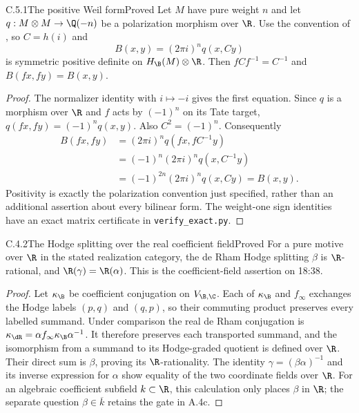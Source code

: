 \begin{result}{C.5.1}{The positive Weil form}{Proved}
Let $M$ have pure weight $n$ and let $q:M\otimes M\to\Q(-n)$ be a polarization morphism over $\R$. Use the convention of \cite[(5.4)--(5.5)]{MilneShimura}, so $C=h(i)$ and
\[
 B(x,y)=(2\pi i)^n q(x,Cy)
\]
is symmetric positive definite on $H_\B(M)\otimes\R$. Then $fCf^{-1}=C^{-1}$ and $B(fx,fy)=B(x,y)$.
\end{result}
\begin{proof}
The normalizer identity with $i\mapsto-i$ gives the first equation. Since $q$ is a morphism over $\R$ and $f$ acts by $(-1)^n$ on its Tate target, $q(fx,fy)=(-1)^nq(x,y)$. Also $C^2=(-1)^n$. Consequently
\[
 \begin{aligned}
 B(fx,fy)
 &=(2\pi i)^nq(fx,fC^{-1}y)\\
 &=(-1)^n(2\pi i)^nq(x,C^{-1}y)\\
 &=(-1)^{2n}(2\pi i)^nq(x,Cy)=B(x,y).
 \end{aligned}
\]
Positivity is exactly the polarization convention just specified, rather than an additional assertion about every bilinear form. The weight-one sign identities have an exact matrix certificate in \texttt{verify\_exact.py}.
\end{proof}

\begin{result}{C.4.2}{The Hodge splitting over the real coefficient field}{Proved}
For a pure motive over $\R$ in the stated realization category, the de Rham Hodge splitting $\beta$ is $\R$-rational, and $\R(\gamma)=\R(\alpha)$. This is the coefficient-field assertion on 18:38.
\end{result}
\begin{proof}
Let $\kappa_{\B}$ be coefficient conjugation on $V_{\B,\C}$. Each of $\kappa_{\B}$ and $f_\infty$ exchanges the Hodge labels $(p,q)$ and $(q,p)$, so their commuting product preserves every labelled summand. Under comparison the real de Rham conjugation is $\kappa_{\dR}=\alpha f_\infty\kappa_{\B}\alpha^{-1}$. It therefore preserves each transported summand, and the isomorphism from a summand to its Hodge-graded quotient is defined over $\R$. Their direct sum is $\beta$, proving its $\R$-rationality. The identity $\gamma=(\beta\alpha)^{-1}$ and its inverse expression for $\alpha$ show equality of the two coordinate fields over $\R$. For an algebraic coefficient subfield $k\subset\R$, this calculation only places $\beta$ in $\R$; the separate question $\beta\in\overline{k}$ retains the gate in A.4c.
\end{proof}
